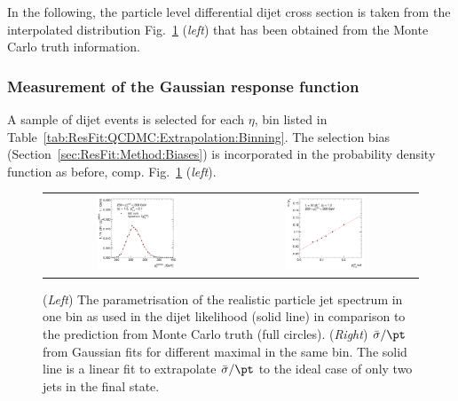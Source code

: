 In the following, the particle level differential dijet cross section is taken from the interpolated \ptgen distribution Fig.~\ref{fig:ResFit:QCDMC:Extrapolation:Gauss:ExBin:SpectrumAndExtrapolation} (\textit{left}) that has been obtained from the Monte Carlo truth information. 



\subsubsection{Measurement of the Gaussian response function}\label{sec:ResFit:QCDMC:Gauss}

A sample of dijet events is selected for each $\eta$, \pt bin listed in Table~\ref{tab:ResFit:QCDMC:Extrapolation:Binning}.
The selection bias (Section~\ref{sec:ResFit:Method:Biases}) is incorporated in the probability density function as before, comp. Fig.~\ref{fig:ResFit:QCDMC:Extrapolation:Gauss:ExBin:SpectrumAndExtrapolation} (\textit{left}).

\begin{figure}[ht]
  \centering
  \begin{tabular}{cc}
    \includegraphics[width=0.45\textwidth]{figures/ResFit_Spring10QCDFlat_Gauss_Eta0_Spectrum_PtBin6} &
    \includegraphics[width=0.45\textwidth]{figures/ResFit_Spring10QCDFlat_Gauss_Eta0_ExtrapolatedPar0_PtBin6}
  \end{tabular}
\caption{(\textit{Left}) The parametrisation of the realistic particle jet \pt spectrum in one \pt bin as used in the dijet likelihood (solid line) in comparison to the prediction from Monte Carlo truth (full circles). 
  (\textit{Right}) $\bar{\sigma}/\pt$ from Gaussian fits for different maximal \ptrel in the same \pt bin.
  The solid line is a linear fit to extrapolate $\bar{\sigma}/\pt$ to the ideal case of only two jets in the
  final state.}
\label{fig:ResFit:QCDMC:Extrapolation:Gauss:ExBin:SpectrumAndExtrapolation}
\end{figure}


